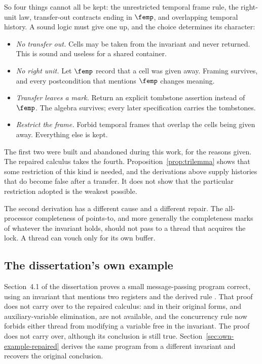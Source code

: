 So four things cannot all be kept: the unrestricted temporal frame rule,
the right-unit law, transfer-out contracts ending in $\femp$, and
overlapping temporal history. A sound logic must give one up, and the
choice determines its character:
\begin{itemize}[nosep]
  \item \emph{No transfer out.} Cells may be taken from the invariant and
        never returned. This is sound and useless for a shared container.
  \item \emph{No right unit.} Let $\femp$ record that a cell was given
        away. Framing survives, and every postcondition that mentions
        $\femp$ changes meaning.
  \item \emph{Transfer leaves a mark.} Return an explicit tombstone
        assertion instead of $\femp$. The algebra survives; every later
        specification carries the tombstones.
  \item \emph{Restrict the frame.} Forbid temporal frames that overlap the
        cells being given away. Everything else is kept.
\end{itemize}
The first two were built and abandoned during this work, for the reasons
given. The repaired calculus takes the fourth.
Proposition~\ref{prop:trilemma} shows that some restriction of this kind is
needed, and the derivations above supply histories that do become false
after a transfer. It does not show that the particular restriction adopted
is the weakest possible.

The second derivation has a different cause and a different repair. The
all-processor completeness of points-to, and more generally the
completeness marks of whatever the invariant holds, should not pass to a
thread that acquires the lock. A thread can vouch only for its own buffer.

\subsection{The dissertation's own example}
\label{sec:own-example}

Section~4.1 of the dissertation proves a small message-passing program
correct, using an invariant that mentions two registers and the derived
rule . That proof does not carry over to the repaired calculus:
 and  in their original forms, and
auxiliary-variable elimination, are not available, and the concurrency rule now forbids either thread from
modifying a variable free in the invariant. The proof does not carry
over, although its conclusion is still true.
Section~\ref{sec:own-example-repaired} derives the same program from a
different invariant and recovers the original conclusion.
